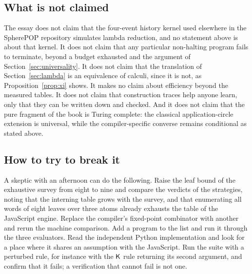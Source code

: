 \subsection{What is not claimed}

The essay does not claim that the four-event history kernel used elsewhere in the SpherePOP repository simulates lambda reduction, and no statement above is about that kernel. It does not claim that any particular non-halting program fails to terminate, beyond a budget exhausted and the argument of Section~\ref{sec:universality}. It does not claim that the translation of Section~\ref{sec:lambda} is an equivalence of calculi, since it is not, as Proposition~\ref{prop:xi} shows. It makes no claim about efficiency beyond the measured tables. It does not claim that construction traces help anyone learn, only that they can be written down and checked. And it does not claim that the pure fragment of the book is Turing complete: the classical application-circle extension is universal, while the compiler-specific converse remains conditional as stated above.

\subsection{How to try to break it}

A skeptic with an afternoon can do the following. Raise the leaf bound of the exhaustive survey from eight to nine and compare the verdicts of the strategies, noting that the interning table grows with the survey, and that enumerating all words of eight leaves over three atoms already exhausts the table of the JavaScript engine. Replace the compiler's fixed-point combinator with another and rerun the machine comparison. Add a program to the list and run it through the three evaluators. Read the independent Python implementation and look for a place where it shares an assumption with the JavaScript. Run the suite with a perturbed rule, for instance with the $\mathsf{K}$ rule returning its second argument, and confirm that it fails; a verification that cannot fail is not one.
